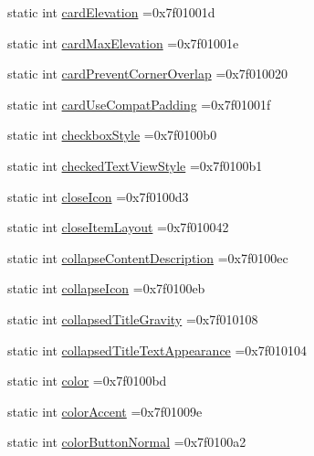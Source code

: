 \begin{DoxyCompactItemize}
static int \hyperlink{classandroid_1_1support_1_1v4_1_1R_1_1attr_ae0e8dfe0af81d234bebc4a066c5b5c2f}{card\+Elevation} =0x7f01001d
\item 
static int \hyperlink{classandroid_1_1support_1_1v4_1_1R_1_1attr_ad18cbbc644b56d8fbbc0f10f5ddba48a}{card\+Max\+Elevation} =0x7f01001e
\item 
static int \hyperlink{classandroid_1_1support_1_1v4_1_1R_1_1attr_a357305c5fc8069cdf7a25ce68201357f}{card\+Prevent\+Corner\+Overlap} =0x7f010020
\item 
static int \hyperlink{classandroid_1_1support_1_1v4_1_1R_1_1attr_a83aa94d57c705df5e9ea503e23367e56}{card\+Use\+Compat\+Padding} =0x7f01001f
\item 
static int \hyperlink{classandroid_1_1support_1_1v4_1_1R_1_1attr_a04c5a500ffe48ab95d64d07c4206408d}{checkbox\+Style} =0x7f0100b0
\item 
static int \hyperlink{classandroid_1_1support_1_1v4_1_1R_1_1attr_a1607a1060b69cce75845ca5e08c7a782}{checked\+Text\+View\+Style} =0x7f0100b1
\item 
static int \hyperlink{classandroid_1_1support_1_1v4_1_1R_1_1attr_af7159ba49dfc915e970744102e5910fe}{close\+Icon} =0x7f0100d3
\item 
static int \hyperlink{classandroid_1_1support_1_1v4_1_1R_1_1attr_aceba222aab6eef55aba6d3ec6be64f78}{close\+Item\+Layout} =0x7f010042
\item 
static int \hyperlink{classandroid_1_1support_1_1v4_1_1R_1_1attr_ae883fcfe0059a7c95c4b5111529ff972}{collapse\+Content\+Description} =0x7f0100ec
\item 
static int \hyperlink{classandroid_1_1support_1_1v4_1_1R_1_1attr_a5d0cc1bfeb940bcc6a12235499982d6d}{collapse\+Icon} =0x7f0100eb
\item 
static int \hyperlink{classandroid_1_1support_1_1v4_1_1R_1_1attr_a6ab8e7ec74147d5da3f84ceae4fa0d09}{collapsed\+Title\+Gravity} =0x7f010108
\item 
static int \hyperlink{classandroid_1_1support_1_1v4_1_1R_1_1attr_afc1849f3f9d23c04cc29badfeb12f1f9}{collapsed\+Title\+Text\+Appearance} =0x7f010104
\item 
static int \hyperlink{classandroid_1_1support_1_1v4_1_1R_1_1attr_ae88bfab69b7797740137d224e6656578}{color} =0x7f0100bd
\item 
static int \hyperlink{classandroid_1_1support_1_1v4_1_1R_1_1attr_a4e16840a7763ba26d0f06f85eb077e73}{color\+Accent} =0x7f01009e
\item 
static int \hyperlink{classandroid_1_1support_1_1v4_1_1R_1_1attr_a6d8ed605776f3064c9eccb0a7be8f328}{color\+Button\+Normal} =0x7f0100a2

\end{DoxyCompactItemize}
